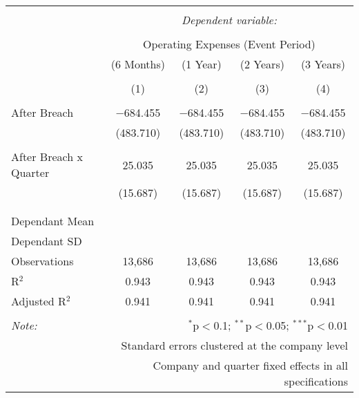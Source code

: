 
\begin{table}[!htbp] \centering 
  \caption{} 
  \label{} 
\begin{tabular}{@{\extracolsep{5pt}}lcccc} 
\\[-1.8ex]\hline 
\hline \\[-1.8ex] 
 & \multicolumn{4}{c}{\textit{Dependent variable:}} \\ 
\cline{2-5} 
\\[-1.8ex] & \multicolumn{4}{c}{Operating Expenses (Event Period)} \\ 
 & (6 Months) & (1 Year) & (2 Years) & (3 Years) \\ 
\\[-1.8ex] & (1) & (2) & (3) & (4)\\ 
\hline \\[-1.8ex] 
 After Breach & $-$684.455 & $-$684.455 & $-$684.455 & $-$684.455 \\ 
  & (483.710) & (483.710) & (483.710) & (483.710) \\ 
  & & & & \\ 
 After Breach x Quarter & 25.035 & 25.035 & 25.035 & 25.035 \\ 
  & (15.687) & (15.687) & (15.687) & (15.687) \\ 
  & & & & \\ 
\hline \\[-1.8ex] 
Dependant Mean &  &  &  &  \\ 
Dependant SD &  &  &  &  \\ 
Observations & 13,686 & 13,686 & 13,686 & 13,686 \\ 
R$^{2}$ & 0.943 & 0.943 & 0.943 & 0.943 \\ 
Adjusted R$^{2}$ & 0.941 & 0.941 & 0.941 & 0.941 \\ 
\hline 
\hline \\[-1.8ex] 
\textit{Note:}  & \multicolumn{4}{r}{$^{*}$p$<$0.1; $^{**}$p$<$0.05; $^{***}$p$<$0.01} \\ 
 & \multicolumn{4}{r}{Standard errors clustered at the company level} \\ 
 & \multicolumn{4}{r}{Company and quarter fixed effects in all specifications} \\ 
\end{tabular} 
\end{table} 
